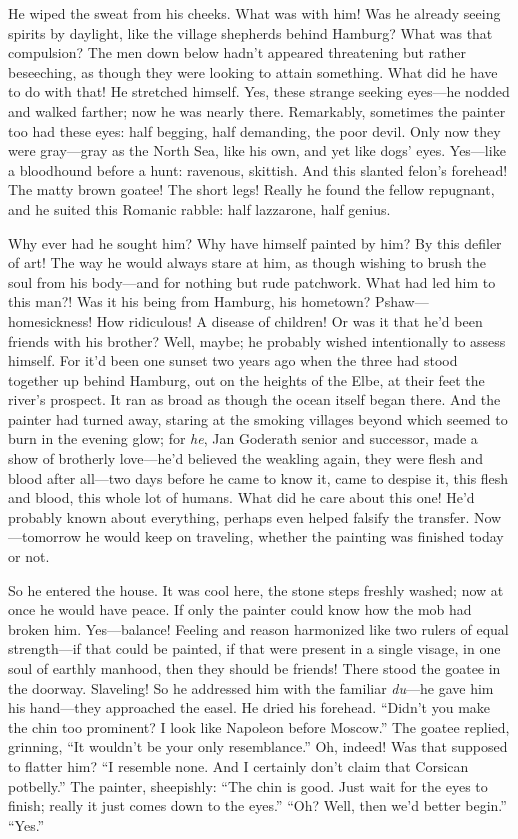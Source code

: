 \documentclass[12pt,a4paper]{article}
\begin{document}
He wiped the sweat from his cheeks. What was with him! Was he already seeing spirits by daylight, like the village shepherds behind Hamburg? What was that compulsion? The men down below hadn’t appeared threatening but rather beseeching, as though they were looking to attain something. What did he have to do with that! He stretched himself. Yes, these strange seeking eyes—he nodded and walked farther; now he was nearly there. Remarkably, sometimes the painter too had these eyes: half begging, half demanding, the poor devil. Only now they were gray—gray as the North Sea, like his own, and yet like dogs’ eyes. Yes—like a bloodhound before a hunt: ravenous, skittish. And this slanted felon’s forehead! The matty brown goatee! The short legs! Really he found the fellow repugnant, and he suited this Romanic rabble: half lazzarone, half genius.

Why ever had he sought him? Why have himself painted by him? By this defiler of art! The way he would always stare at him, as though wishing to brush the soul from his body—and for nothing but rude patchwork. What had led him to this man?! Was it his being from Hamburg, his hometown? Pshaw—homesickness! How ridiculous! A disease of children! Or was it that he’d been friends with his brother? Well, maybe; he probably wished intentionally to assess himself. For it’d been one sunset two years ago when the three had stood together up behind Hamburg, out on the heights of the Elbe, at their feet the river’s prospect. It ran as broad as though the ocean itself began there. And the painter had turned away, staring at the smoking villages beyond which seemed to burn in the evening glow; for \textit{he}, Jan Goderath senior and successor, made a show of brotherly love—he’d believed the weakling again, they were flesh and blood after all—two days before he came to know it, came to despise it, this flesh and blood, this whole lot of humans. What did he care about this one! He’d probably known about everything, perhaps even helped falsify the transfer. Now—tomorrow he would keep on traveling, whether the painting was finished today or not.

So he entered the house. It was cool here, the stone steps freshly washed; now at once he would have peace. If only the painter could know how the mob had broken him. Yes—balance! Feeling and reason harmonized like two rulers of equal strength—if that could be painted, if that were present in a single visage, in one soul of earthly manhood, then they should be friends! There stood the goatee in the doorway. Slaveling! So he addressed him with the familiar \textit{du}—he gave him his hand—they approached the easel. He dried his forehead. “Didn’t you make the chin too prominent? I look like Napoleon before Moscow.” The goatee replied, grinning, “It wouldn’t be your only resemblance.” Oh, indeed! Was that supposed to flatter him? “I resemble none. And I certainly don’t claim that Corsican potbelly.” The painter, sheepishly: “The chin is good. Just wait for the eyes to finish; really it just comes down to the eyes.” “Oh? Well, then we’d better begin.” “Yes.”
\end{document}
